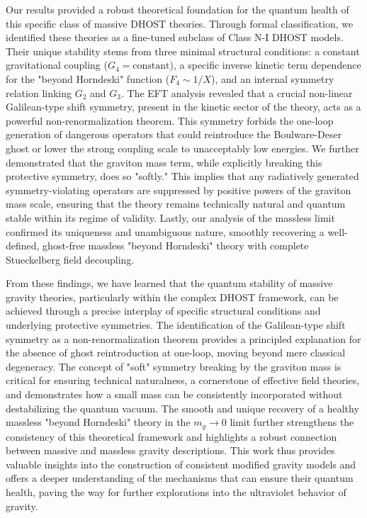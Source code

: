 \documentclass[twocolumn]{aastex631}
\begin{document}
Our results provided a robust theoretical foundation for the quantum health of this specific class of massive DHOST theories. Through formal classification, we identified these theories as a fine-tuned subclass of Class N-I DHOST models. Their unique stability stems from three minimal structural conditions: a constant gravitational coupling ($G_4 = \text{constant}$), a specific inverse kinetic term dependence for the "beyond Horndeski" function ($F_4 \sim 1/X$), and an internal symmetry relation linking $G_2$ and $G_3$. The EFT analysis revealed that a crucial non-linear Galilean-type shift symmetry, present in the kinetic sector of the theory, acts as a powerful non-renormalization theorem. This symmetry forbids the one-loop generation of dangerous operators that could reintroduce the Boulware-Deser ghost or lower the strong coupling scale to unacceptably low energies. We further demonstrated that the graviton mass term, while explicitly breaking this protective symmetry, does so "softly." This implies that any radiatively generated symmetry-violating operators are suppressed by positive powers of the graviton mass scale, ensuring that the theory remains technically natural and quantum stable within its regime of validity. Lastly, our analysis of the massless limit confirmed its uniqueness and unambiguous nature, smoothly recovering a well-defined, ghost-free massless "beyond Horndeski" theory with complete Stueckelberg field decoupling.

From these findings, we have learned that the quantum stability of massive gravity theories, particularly within the complex DHOST framework, can be achieved through a precise interplay of specific structural conditions and underlying protective symmetries. The identification of the Galilean-type shift symmetry as a non-renormalization theorem provides a principled explanation for the absence of ghost reintroduction at one-loop, moving beyond mere classical degeneracy. The concept of "soft" symmetry breaking by the graviton mass is critical for ensuring technical naturalness, a cornerstone of effective field theories, and demonstrates how a small mass can be consistently incorporated without destabilizing the quantum vacuum. The smooth and unique recovery of a healthy massless "beyond Horndeski" theory in the $m_g \to 0$ limit further strengthens the consistency of this theoretical framework and highlights a robust connection between massive and massless gravity descriptions. This work thus provides valuable insights into the construction of consistent modified gravity models and offers a deeper understanding of the mechanisms that can ensure their quantum health, paving the way for further explorations into the ultraviolet behavior of gravity.
\end{document}
